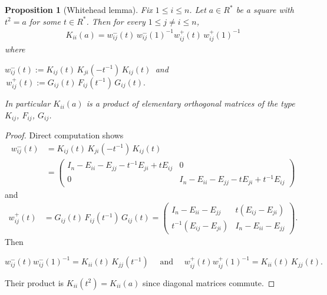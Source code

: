 \documentclass[11pt]{amsart}
\newtheorem{proposition}[theorem]{Proposition}
\theoremstyle{definition}
\theoremstyle{remark}
\theoremstyle{remark}
\newcommand{\diag}{\operatorname{diag}}
\begin{document}
\begin{proposition}[Whitehead lemma]
\label{prop:whitehead} 
Fix $1\le i\le n$. Let $a\in R^\ast$ be a square with $t^2=a$ for some $t\in R^\ast$.
Then for every $1 \le j \neq i \le n$, 
\begin{align*}
 K_{ii}(a) =  w^-_{ij}(t)\,w^-_{ij}(1)^{-1} w^+_{ij}(t)\,w^+_{ij}(1)^{-1} %
\end{align*}
where 
\begin{center}
   $ w^-_{ij}(t):=K_{ij}(t)\,K_{ji}(-t^{-1})\,K_{ij}(t) \,$
    and $\,
    w^+_{ij}(t):=G_{ij}(t)\,F_{ij}(t^{-1})\,G_{ij}(t).$
\end{center}
In particular $K_{ii}(a)$
is a product of elementary orthogonal matrices of the type $K_{ij}$, $F_{ij}$, $G_{ij}$.
\end{proposition}
\begin{proof}
    Direct computation shows
    \begin{align*}
    w^-_{ij}(t)
    &=
    K_{ij}(t)\,K_{ji}(-t^{-1})\,K_{ij}(t) \\
    &=
    \begin{pmatrix}
    I_n-E_{ii}-E_{jj}-t^{-1}E_{ji}+tE_{ij} & 0\\
    0 & I_n-E_{ii}-E_{jj}-tE_{ji}+t^{-1}E_{ij}
    \end{pmatrix}
    \end{align*}
    and 
    \begin{align*}
        w^+_{ij}(t) &= G_{ij}(t)\,F_{ij}(t^{-1})\,G_{ij}(t) 
    =
    \begin{pmatrix}
    I_n-E_{ii}-E_{jj} & t(E_{ij}-E_{ji})\\
    t^{-1}(E_{ij}-E_{ji}) & I_n-E_{ii}-E_{jj}
    \end{pmatrix}.
    \end{align*}
    Then
    \begin{center}
    $w^-_{ij}(t) w^-_{ij}(1)^{-1}=K_{ii}(t)\,K_{jj}(t^{-1}) \quad \text{ and } \quad w^+_{ij}(t) w^+_{ij}(1)^{-1} =K_{ii}(t)\,K_{jj}(t).$
    \end{center}
    Their product is $K_{ii}(t^2) = K_{ii}(a)$ since diagonal matrices commute. 
\end{proof}
\end{document}
